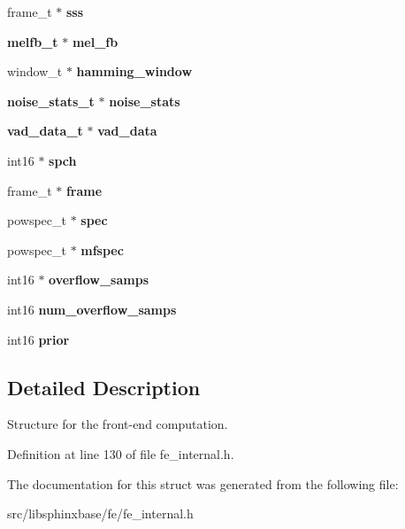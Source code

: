 \begin{DoxyCompactItemize}
\item 
frame\-\_\-t $\ast$ {\bfseries sss}\label{structfe__s_a6525c59397073d363e1844c28746fcb9}

\item 
{\bf melfb\-\_\-t} $\ast$ {\bfseries mel\-\_\-fb}\label{structfe__s_ae5a054dbac5e32cf028b6d6d4c9391bd}

\item 
window\-\_\-t $\ast$ {\bfseries hamming\-\_\-window}\label{structfe__s_ad47433337a370e452070ffddce87e474}

\item 
{\bf noise\-\_\-stats\-\_\-t} $\ast$ {\bfseries noise\-\_\-stats}\label{structfe__s_a6b1303b8c74a676ca9dcc9adc07033e9}

\item 
{\bf vad\-\_\-data\-\_\-t} $\ast$ {\bfseries vad\-\_\-data}\label{structfe__s_aaae66e5327a74c4270c8f0decd4d4389}

\item 
int16 $\ast$ {\bfseries spch}\label{structfe__s_a7d49693c1fa1b14bbcd25b87ad97935b}

\item 
frame\-\_\-t $\ast$ {\bfseries frame}\label{structfe__s_a6fe89784eb5d23ee812439f427d33fe6}

\item 
powspec\-\_\-t $\ast$ {\bfseries spec}\label{structfe__s_af455b0ee3f8d81ca84ac88d4ea04e860}

\item 
powspec\-\_\-t $\ast$ {\bfseries mfspec}\label{structfe__s_a87fd448109884fc3d796b926b67697e7}

\item 
int16 $\ast$ {\bfseries overflow\-\_\-samps}\label{structfe__s_a7975216c6a540fa498352736404797b1}

\item 
int16 {\bfseries num\-\_\-overflow\-\_\-samps}\label{structfe__s_ac22fe7c117ef00eb513d7d0771333ddd}

\item 
int16 {\bfseries prior}\label{structfe__s_ae6af635a19dac6426bf882a3fc5b069b}

\end{DoxyCompactItemize}


\subsection{Detailed Description}
Structure for the front-\/end computation. 



Definition at line 130 of file fe\-\_\-internal.\-h.



The documentation for this struct was generated from the following file\-:\begin{DoxyCompactItemize}
\item 
src/libsphinxbase/fe/fe\-\_\-internal.\-h\end{DoxyCompactItemize}
